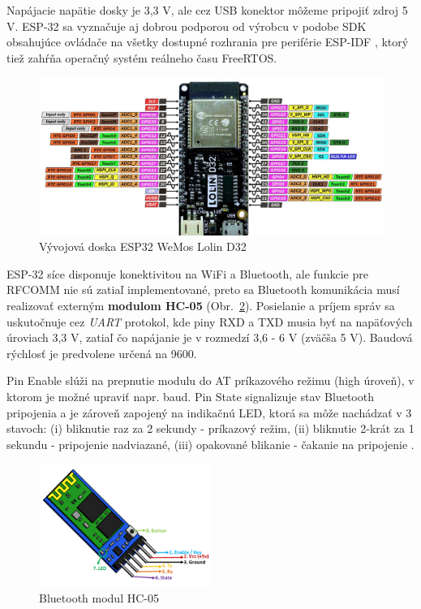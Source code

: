 \documentclass[12pt, a4paper]{article}
\begin{document}
Napájacie napätie dosky je 3,3 V, ale cez USB konektor môžeme pripojiť zdroj 5 V. ESP-32 sa vyznačuje aj dobrou podporou od výrobcu v podobe SDK obsahujúce ovládače na všetky dostupné rozhrania pre periférie ESP-IDF \cite{noauthor_esp-idf_nodate}, ktorý tiež zahŕňa operačný systém reálneho času FreeRTOS.

\begin{figure}[h]
	\centering
	\includegraphics[width=\textwidth]{assets/esp32.jpg}
	\caption{Vývojová doska ESP32 WeMos Lolin D32 \cite{mischianti_esp32_2023}}
	\label{fig:esp32}
\end{figure}

ESP-32 síce disponuje konektivitou na WiFi a Bluetooth, ale funkcie pre RFCOMM nie sú zatiaľ implementované, preto sa Bluetooth komunikácia musí realizovať externým \textbf{modulom HC-05} (Obr.~\ref{fig:hc-05}). Posielanie a príjem správ sa uskutočnuje cez \emph{UART} protokol, kde piny RXD a TXD musia byť na napäťových úroviach 3,3 V, zatiaľ čo napájanie je v rozmedzí 3,6 - 6 V (zväčša 5 V). Baudová rýchlosť je predvolene určená na 9600. 

Pin Enable slúži na prepnutie modulu do AT príkazového režimu (high úroveň), v ktorom je možné upraviť napr. baud. Pin State signalizuje stav Bluetooth pripojenia a je zároveň zapojený na indikačnú LED, ktorá sa môže nachádzať v 3 stavoch: (i) bliknutie raz za 2 sekundy - príkazový režim, (ii) bliknutie 2-krát za 1 sekundu - pripojenie nadviazané, (iii) opakované blikanie - čakanie na pripojenie \cite{noauthor_hc-05_nodate}.

\begin{figure}[h]
	\centering
	\includegraphics[width=0.5\textwidth]{assets/hc-05.png}
	\caption{Bluetooth modul HC-05 \cite{noauthor_hc-05_nodate}}
	\label{fig:hc-05}
\end{figure}
\end{document}
